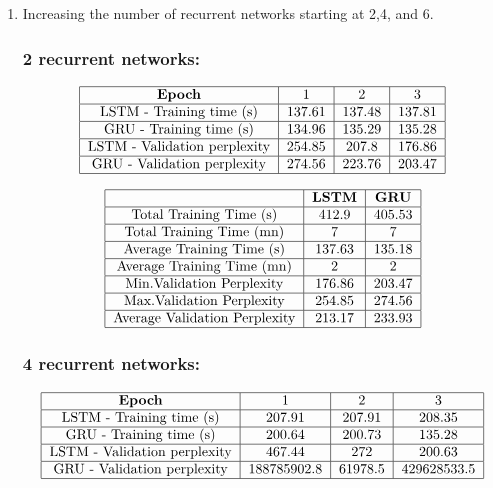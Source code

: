 \documentclass[11pt]{article}
\newcommand{\0}{\mat{0}}
\begin{document}
\begin{itemize}
\begin{enumerate}
	\item Increasing the number of recurrent networks starting at 2,4, and 6.
	\subsubsection*{\textbf{2 recurrent networks:}}
	  \[
  	 	\begin{tabular}{| c | c | c | c |}
  	 	 	\hline
	 	 		\textbf{Epoch} & 1 & 2 & 3  \\
	  	 	\hline
	 			LSTM - Training time (s)		& 137.61 & 137.48 & 137.81 \\
	 	 	\hline
				GRU - Training time (s)		& 134.96& 135.29 & 135.28 \\
			\hline 
				LSTM - Validation perplexity	& 254.85 & 207.8 & 176.86 \\
			\hline 
				GRU - Validation perplexity	& 274.56 & 223.76 & 203.47 \\
			\hline
		\end{tabular}
	\] 

	  \[
  	 	\begin{tabular}{| c | c | c |}
  	 	 	\hline
	 	 		& \textbf{LSTM} &  \textbf{GRU} \\
	  	 	\hline
	 			Total Training Time (s)		& 412.9 & 405.53 \\
	 	 	\hline
				Total Training Time (mn)		& 7 & 7 \\
			\hline 
				Average Training Time (s)	 	& 137.63 & 135.18 \\
			\hline 
				Average Training Time (mn)	& 2 & 2 \\
			\hline
				Min.Validation Perplexity		& 176.86 & 203.47 \\
			\hline
				Max.Validation Perplexity		& 254.85 & 274.56 \\
			\hline
				Average Validation Perplexity	& 213.17 & 233.93 \\
			\hline
		\end{tabular}
	\] 
	
	\subsubsection*{\textbf{4 recurrent networks:}}
	  \[
  	 	\begin{tabular}{| c | c | c | c |}
  	 	 	\hline
	 	 		\textbf{Epoch} & 1 & 2 & 3  \\
	  	 	\hline
	 			LSTM - Training time (s)		& 207.91 & 207.91 & 208.35 \\
	 	 	\hline
				GRU - Training time (s)		& 200.64 & 200.73 & 135.28 \\
			\hline 
				LSTM - Validation perplexity	& 467.44 & 272 & 200.63 \\
			\hline 
				GRU - Validation perplexity	& 188785902.8 & 61978.5	 & 429628533.5 \\
			\hline
		\end{tabular}
	\] 


\end{enumerate}
\end{itemize}
\end{document}
